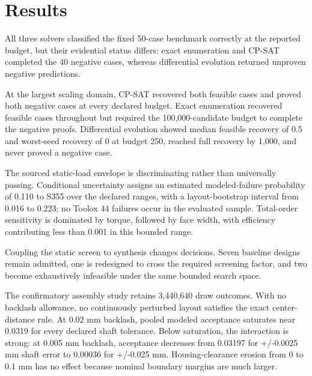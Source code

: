 \documentclass[preprint,12pt]{elsarticle}
\begin{document}
\section{Results}
All three solvers classified the fixed 50-case benchmark correctly at the reported budget, but their evidential status differs: exact enumeration and CP-SAT completed the 40 negative cases, whereas differential evolution returned unproven negative predictions.

At the largest scaling domain, CP-SAT recovered both feasible cases and proved both negative cases at every declared budget. Exact enumeration recovered feasible cases throughout but required the 100,000-candidate budget to complete the negative proofs. Differential evolution showed median feasible recovery of 0.5 and worst-seed recovery of 0 at budget 250, reached full recovery by 1,000, and never proved a negative case.

The sourced static-load envelope is discriminating rather than universally passing. Conditional uncertainty assigns an estimated modeled-failure probability of 0.110 to S355 over the declared ranges, with a layout-bootstrap interval from 0.016 to 0.223; no Toolox 44 failures occur in the evaluated sample. Total-order sensitivity is dominated by torque, followed by face width, with efficiency contributing less than 0.001 in this bounded range.

Coupling the static screen to synthesis changes decisions. Seven baseline designs remain admitted, one is redesigned to cross the required screening factor, and two become exhaustively infeasible under the same bounded search space.

The confirmatory assembly study retains 3,440,640 draw outcomes. With no backlash allowance, no continuously perturbed layout satisfies the exact center-distance rule. At 0.02 mm backlash, pooled modeled acceptance saturates near 0.0319 for every declared shaft tolerance. Below saturation, the interaction is strong: at 0.005 mm backlash, acceptance decreases from 0.03197 for +/-0.0025 mm shaft error to 0.00036 for +/-0.025 mm. Housing-clearance erosion from 0 to 0.1 mm has no effect because nominal boundary margins are much larger.
\end{document}
